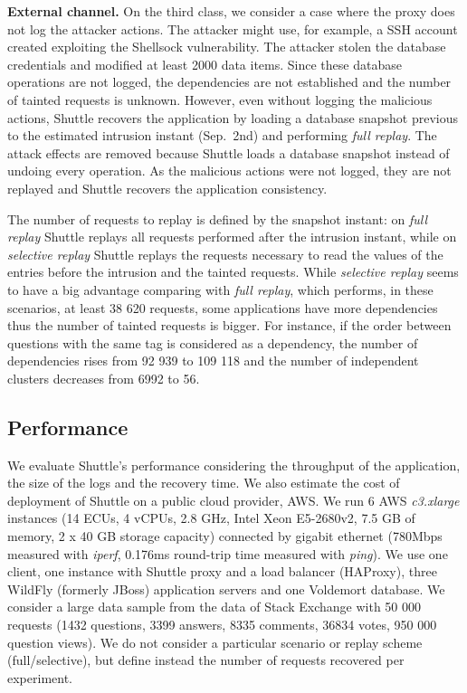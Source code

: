 \textbf{External channel.}
On the third class, we consider a case where the proxy does not log the attacker actions. The attacker might use, for example, a SSH account created exploiting the Shellsock vulnerability. The attacker stolen the database credentials and modified at least 2000 data items. Since these database operations are not logged, the dependencies are not established and the number of tainted requests is unknown. However, even without logging the malicious actions, Shuttle recovers the application by loading a database snapshot previous to the estimated intrusion instant (Sep.~2nd) and performing \textit{full replay}. The attack effects are removed because Shuttle loads a database snapshot instead of undoing every operation. As the malicious actions were not logged, they are not replayed and Shuttle recovers the application consistency.


The number of requests to replay is defined by the snapshot instant: on \textit{full replay} Shuttle replays all requests performed after the intrusion instant, while on \textit{selective replay} Shuttle replays the requests necessary to read the values of the entries before the intrusion and the tainted requests. While  \textit{selective replay} seems to have a big advantage comparing with  \textit{full replay}, which performs, in these scenarios, at least 38 620 requests, some applications have more dependencies thus the number of tainted requests is bigger. For instance, if the order between questions with the same tag is considered as a dependency, the number of dependencies rises from 92 939 to 109 118 and the number of independent clusters decreases from 6992 to 56. %



\subsection{Performance}
\label{sec:evaluation:performance}

We evaluate Shuttle's performance considering the throughput of the application, the size of the logs and the recovery time. We also estimate the cost of deployment of Shuttle on a public cloud provider, \acf{AWS}. We run 6 \ac{AWS} \textit{c3.xlarge} instances (14 ECUs, 4 vCPUs, 2.8 GHz, Intel Xeon E5-2680v2, 7.5 GB of memory, 2 x 40 GB storage capacity) connected by gigabit ethernet (780Mbps measured with \emph{iperf}, 0.176ms round-trip time measured with \emph{ping}). We use one client, one instance with Shuttle proxy and a load balancer (HAProxy), three WildFly (formerly JBoss) application servers and one Voldemort database. We consider a large data sample from the data of Stack Exchange with 50 000 requests (1432 questions, 3399 answers, 8335 comments, 36834 votes, 950 000 question views). We do not consider a particular scenario or replay scheme (full/selective), but define instead the number of requests recovered per experiment.

